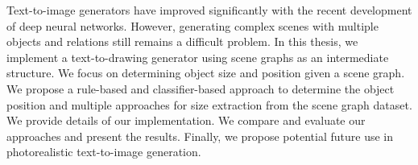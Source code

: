 \documentclass[12pt]{report}
\begin{document}

Text-to-image generators have improved significantly with the recent development of deep neural networks. However, generating complex scenes with multiple objects and relations still remains a difficult problem. In this thesis, we implement a text-to-drawing generator using scene graphs as an intermediate structure. We focus on determining object size and position given a scene graph. We propose a rule-based and classifier-based approach to determine the object position and multiple approaches for size extraction from the scene graph dataset. We provide details of our implementation. We compare and evaluate our approaches and present the results. Finally, we propose potential future use in photorealistic text-to-image generation.
\end{document}
